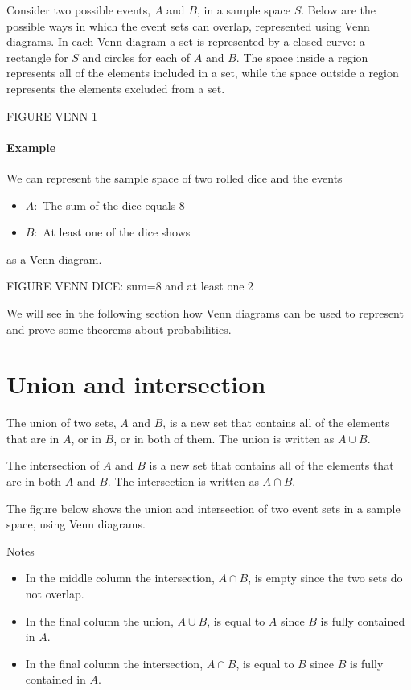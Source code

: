 \documentclass[a4paper,11pt]{report}
\begin{document}
Consider two possible events, $A$ and $B$, in a sample space $S$. Below
are the possible ways in which the event sets can overlap, represented
using Venn diagrams. In each Venn diagram a set is represented by a
closed curve: a rectangle for $S$ and circles for each of $A$ and $B$.
The space inside a region represents all of the elements included in a
set, while the space outside a region represents the elements excluded
from a set.

FIGURE VENN 1

\paragraph{Example} We can represent the sample space of two rolled dice
and the events
\begin{itemize}
\item $A:$ The sum of the dice equals 8
\item $B:$ At least one of the dice shows
\end{itemize}
as a Venn diagram.

FIGURE VENN DICE: sum=8 and at least one 2

We will see in the following section how Venn diagrams can be used to
represent and prove some theorems about probabilities.

\section{Union and intersection}
The union of two sets, $A$ and $B$, is a new set that contains all of
the elements that are in $A$, or in $B$, or in both of them. The union
is written as $A \cup B$.

The intersection of $A$ and $B$ is a new set that contains all of the
elements that are in both $A$ and $B$. The intersection is written as
$A \cap B$.

The figure below shows the union and intersection of two event sets in
a sample space, using Venn diagrams.



Notes
\begin{itemize}
\item In the middle column the intersection, $A \cap B$, is empty
  since the two sets do not overlap.
\item In the final column the union, $A \cup B$, is equal to $A$ since
  $B$ is fully contained in $A$.
\item In the final column the intersection, $A \cap B$, is equal to
  $B$ since $B$ is fully contained in $A$.
\end{itemize}
\end{document}
